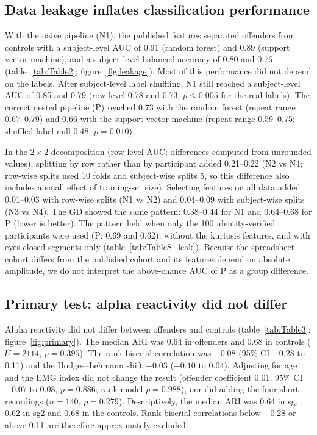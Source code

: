 \subsection{Data leakage inflates classification performance}
\label{sec:res-leakage}

With the naive pipeline (N1), the published features separated offenders from controls with a subject-level AUC of 0.91 (random forest) and 0.89 (support vector machine), and a subject-level balanced accuracy of 0.80 and 0.76 (table~\ref{tab:Table2}; figure~\ref{fig:leakage}). Most of this performance did not depend on the labels. After subject-level label shuffling, N1 still reached a subject-level AUC of 0.85 and 0.79 (row-level 0.78 and 0.73; $p \le 0.005$ for the real labels). The correct nested pipeline (P) reached 0.73 with the random forest (repeat range 0.67--0.79) and 0.66 with the support vector machine (repeat range 0.59--0.75; shuffled-label null 0.48, $p = 0.010$).

In the $2 \times 2$ decomposition (row-level AUC; differences computed from unrounded values), splitting by row rather than by participant added 0.21--0.22 (N2 vs N4; row-wise splits used 10 folds and subject-wise splits 5, so this difference also includes a small effect of training-set size). Selecting features on all data added 0.01--0.03 with row-wise splits (N1 vs N2) and 0.04--0.09 with subject-wise splits (N3 vs N4). The GD showed the same pattern: 0.38--0.44 for N1 and 0.64--0.68 for P (lower is better). The pattern held when only the 100 identity-verified participants were used (P: 0.69 and 0.62), without the kurtosis features, and with eyes-closed segments only (table~\ref{tab:TableS_leak}). Because the spreadsheet cohort differs from the published cohort and its features depend on absolute amplitude, we do not interpret the above-chance AUC of P as a group difference.

\subsection{Primary test: alpha reactivity did not differ}
\label{sec:res-primary}

Alpha reactivity did not differ between offenders and controls (table~\ref{tab:Table3}; figure~\ref{fig:primary}). The median ARI was 0.64 in offenders and 0.68 in controls ($U = 2114$, $p = 0.395$). The rank-biserial correlation was $-0.08$ (95\% CI $-0.28$ to 0.11) and the Hodges--Lehmann shift $-0.03$ ($-0.10$ to 0.04). Adjusting for age and the EMG index did not change the result (offender coefficient 0.01, 95\% CI $-0.07$ to 0.08, $p = 0.886$; rank model $p = 0.988$), nor did adding the four short recordings ($n = 140$, $p = 0.279$). Descriptively, the median ARI was 0.64 in sg, 0.62 in sg2 and 0.68 in the controls. Rank-biserial correlations below $-0.28$ or above 0.11 are therefore approximately excluded.

